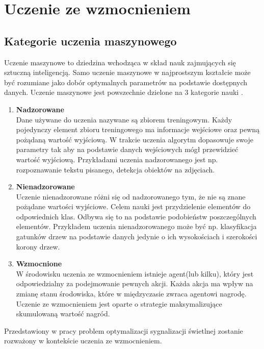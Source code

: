 \documentclass[12pt]{book}
\theoremstyle{plain}
\begin{document}
\chapter{Uczenie ze wzmocnieniem} \label{chapter:reinforcement}
\section{Kategorie uczenia maszynowego}
Uczenie maszynowe to dziedzina wchodząca w skład nauk zajmujących się sztuczną inteligencją\cite{ml_ai}. Samo uczenie maszynowe w najprostszym kształcie może być rozumiane jako dobór optymalnych parametrów na podstawie dostępnych danych. Uczenie maszynowe jest powszechnie dzielone na 3 kategorie nauki \cite{machineLearningClassification}.
\begin{enumerate}
	\item \textbf{Nadzorowane} \\
	Dane używane do uczenia nazywane są zbiorem treningowym. Każdy pojedynczy element zbioru treningowego ma informacje wejściowe oraz pewną pożądaną wartość wyjściową. W trakcie uczenia algorytm dopasowuje swoje parametry tak aby na podstawie danych wejściowych mógł przewidzieć wartość wyjściową. Przykładami uczenia nadzorowanego jest np. rozpoznawanie tekstu pisanego, detekcja obiektów na zdjęciach.
	\item \textbf{Nienadzorowane} \\
	Uczenie nienadzorowane różni się od nadzorowanego tym, że nie  są znane pożądane wartości wyjściowe. Celem nauki jest przydzielenie elementów do odpowiednich klas. Odbywa się to na podstawie podobieństw poszczególnych elementów. Przykładem uczenia nienadzorowanego może być np. klasyfikacja gatunków drzew na podstawie danych jedynie o ich wysokościach i szerokości korony drzew.
	\item \textbf{Wzmocnione} \\
	W środowisku uczenia ze wzmocnieniem istnieje agent(lub kilku), który jest odpowiedzialny za podejmowanie pewnych akcji. Każda akcja ma wpływ na zmianę stanu środowiska, które w międzyczasie zwraca agentowi nagrodę. Uczenie ze wzmocnieniem jest oparte o strategie maksymalizujące skumulowaną wartość nagród.
\end{enumerate}
Przedstawiony w pracy problem optymalizacji sygnalizacji świetlnej zostanie rozważony w kontekście uczenia ze wzmocnieniem.
\end{document}
